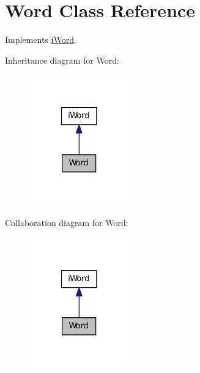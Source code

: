\hypertarget{classWord}{
\section{Word Class Reference}
\label{classWord}
}


Implements \hyperlink{classiWord}{iWord}.  




Inheritance diagram for Word:
\nopagebreak
\begin{figure}[H]
\begin{center}
\leavevmode
\includegraphics[width=122pt]{classWord__inherit__graph}
\end{center}
\end{figure}


Collaboration diagram for Word:
\nopagebreak
\begin{figure}[H]
\begin{center}
\leavevmode
\includegraphics[width=122pt]{classWord__coll__graph}
\end{center}
\end{figure}
